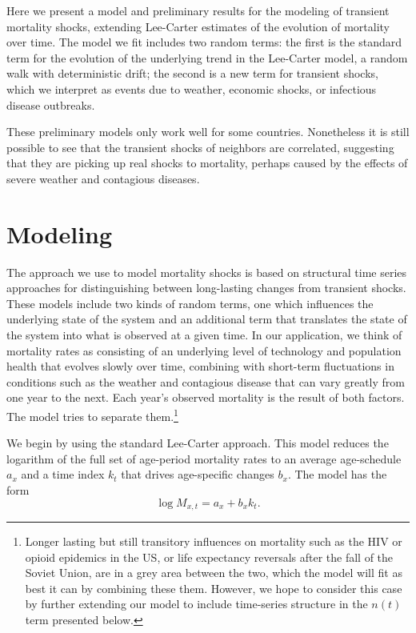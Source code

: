 \documentclass[12pt]{article}
\begin{document}
Here we present a model and preliminary results for the modeling of
transient mortality shocks, extending Lee-Carter estimates of the
evolution of mortality over time. The model we fit includes two random
terms: the first is the standard term for the evolution of the
underlying trend in the Lee-Carter model, a random walk with
deterministic drift; the second is a new term for transient shocks,
which we interpret as events due to weather, economic shocks, or
infectious disease outbreaks.

These preliminary models only work well for some
countries. Nonetheless it is still possible to see that the transient
shocks of neighbors are correlated, suggesting that they are picking
up real shocks to mortality, perhaps caused by the effects of severe
weather and contagious diseases.


\section{Modeling}

The approach we use to model mortality shocks is based on structural
time series approaches for distinguishing between long-lasting changes
from transient shocks. These models include two kinds of random terms,
one which influences the underlying state of the system and an
additional term that translates the state of the system into what is
observed at a given time. In our application, we think of mortality
rates as consisting of an underlying level of technology and
population health that evolves slowly over time, combining with
short-term fluctuations in conditions such as the weather and
contagious disease that can vary greatly from one year to the next.
Each year's observed mortality is the result of both factors. The
model tries to separate them.\footnote{Longer lasting but still
  transitory influences on mortality such as the HIV or opioid
  epidemics in the US, or life expectancy reversals after the fall of
  the Soviet Union, are in a grey area between the two, which the
  model will fit as best it can by combining these them. However, we
  hope to consider this case by further extending our model to include
  time-series structure in the $n(t)$ term presented below.}

We begin by using the standard Lee-Carter approach. This model reduces
the logarithm of the full set of age-period mortality rates to an
average age-schedule $a_x$ and a time index $k_t$ that drives
age-specific changes $b_x$. The model has the form
$$
\log M_{x,t} = a_x + b_x k_t.
$$
\end{document}
